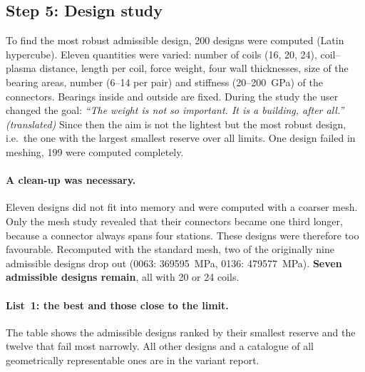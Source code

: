 \subsection*{Step 5: Design study}
To find the most robust admissible design, 200 designs were computed (Latin hypercube). Eleven quantities were varied:
number of coils (16, 20, 24), coil--plasma distance, length per coil, force weight, four wall thicknesses, size of the
bearing areas, number (6--14 per pair) and stiffness (20--200~GPa) of the connectors. Bearings inside and outside are
fixed. During the study the user changed the goal: \emph{“The weight is not so important. It is a building, after
all.” (translated)} Since then the aim is not the lightest but the most robust design, i.e.\ the one with the largest
smallest reserve over all limits. One design failed in meshing, 199 were computed completely.


\paragraph{A clean-up was necessary.} Eleven designs did not fit into memory and were computed with a coarser mesh.
Only the mesh study revealed that their connectors became one third longer, because a connector always spans four
stations. These designs were therefore too favourable. Recomputed with the standard mesh, two of the originally nine
admissible designs drop out (0063: \SI{369}{\to}\SI{595}{MPa}, 0136: \SI{479}{\to}\SI{577}{MPa}).
\textbf{Seven admissible designs remain}, all with 20 or 24 coils.

\paragraph{List~1: the best and those close to the limit.} The table shows the admissible designs ranked by their
smallest reserve and the twelve that fail most narrowly. All other designs and a catalogue of all geometrically
representable ones are in the variant report.
\begin{table}[H]\centering\scriptsize
\caption{Ranking (cleaned). $^\ast$ = recomputed with the standard mesh.}\end{table}

